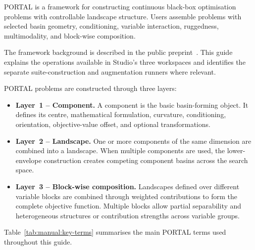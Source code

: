\documentclass[journal,onecolumn]{IEEEtran}
\begin{document}
PORTAL is a framework for constructing continuous black-box optimisation problems with controllable landscape structure. Users assemble problems with selected basin geometry, conditioning, variable interaction, ruggedness, multimodality, and block-wise composition.

The framework background is described in the public preprint~\cite{portal2025framework}. This guide explains the operations available in Studio's three workspaces and identifies the separate suite-construction and augmentation runners where relevant.

PORTAL problems are constructed through three layers:

\begin{itemize}
\item \textbf{Layer~1 -- Component.} A component is the basic basin-forming object. It defines its centre, mathematical formulation, curvature, conditioning, orientation, objective-value offset, and optional transformations.

\item \textbf{Layer~2 -- Landscape.} One or more components of the same dimension are combined into a landscape. When multiple components are used, the lower-envelope construction creates competing component basins across the search space.

\item \textbf{Layer~3 -- Block-wise composition.} Landscapes defined over different variable blocks are combined through weighted contributions to form the complete objective function. Multiple blocks allow partial separability and heterogeneous structures or contribution strengths across variable groups.
\end{itemize}

Table~\ref{tab:manual:key-terms} summarises the main PORTAL terms used throughout this guide.
\end{document}
